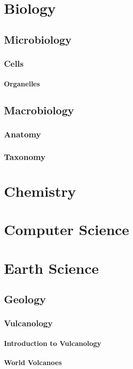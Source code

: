\documentclass[12pt]{book}
\begin{document}
	\section{Biology}
		\subsection{Microbiology}
			\subsubsection{Cells}
				\paragraph{Organelles}
		\subsection{Macrobiology}
			\subsubsection{Anatomy}
			\subsubsection{Taxonomy}
					
	\section{Chemistry}
	\section{Computer Science}
	\newpage
	\section{Earth Science}
		\subsection{Geology}
			\subsubsection{Vulcanology}
			\paragraph{Introduction to Vulcanology}
			\paragraph{World Volcanoes}
			\newpage
\end{document}
